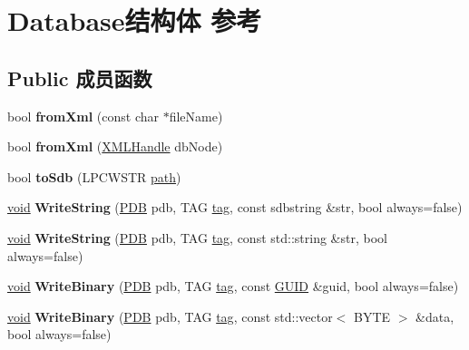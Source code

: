 \hypertarget{struct_database}{}\section{Database结构体 参考}
\label{struct_database}
\subsection*{Public 成员函数}
\begin{DoxyCompactItemize}
\item 
\mbox{\label{struct_database_afda42eacf125c416c552bc852f3f0d7c}} 
bool {\bfseries from\+Xml} (const char $\ast$file\+Name)
\item 
\mbox{\label{struct_database_a363fdbe1184a1688c4fe2e35042c1536}} 
bool {\bfseries from\+Xml} (\hyperlink{classtinyxml2_1_1_x_m_l_handle}{X\+M\+L\+Handle} db\+Node)
\item 
\mbox{\label{struct_database_aa85ba37920b6a3211af8ce2ed1bedc7f}} 
bool {\bfseries to\+Sdb} (L\+P\+C\+W\+S\+TR \hyperlink{structpath}{path})
\item 
\mbox{\label{struct_database_acafa12e1bf28b1a87953c3c4ed6469cf}} 
\hyperlink{interfacevoid}{void} {\bfseries Write\+String} (\hyperlink{struct___d_b}{P\+DB} pdb, T\+AG \hyperlink{structtag}{tag}, const sdbstring \&str, bool always=false)
\item 
\mbox{\label{struct_database_aef2d9c88fa1c9d8006febc97cdbe41e9}} 
\hyperlink{interfacevoid}{void} {\bfseries Write\+String} (\hyperlink{struct___d_b}{P\+DB} pdb, T\+AG \hyperlink{structtag}{tag}, const std\+::string \&str, bool always=false)
\item 
\mbox{\label{struct_database_a6a007cf7c9f25c98e3cee829909a06e6}} 
\hyperlink{interfacevoid}{void} {\bfseries Write\+Binary} (\hyperlink{struct___d_b}{P\+DB} pdb, T\+AG \hyperlink{structtag}{tag}, const \hyperlink{interface_g_u_i_d}{G\+U\+ID} \&guid, bool always=false)
\item 
\mbox{\label{struct_database_a7ba86f8054ca76919e398626a91c49f3}} 
\hyperlink{interfacevoid}{void} {\bfseries Write\+Binary} (\hyperlink{struct___d_b}{P\+DB} pdb, T\+AG \hyperlink{structtag}{tag}, const std\+::vector$<$ B\+Y\+TE $>$ \&data, bool always=false)

\end{DoxyCompactItemize}
